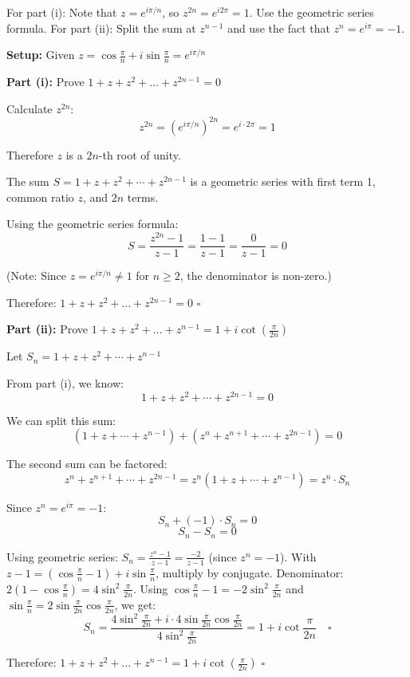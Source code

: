 \begin{hint}
For part (i): Note that $z = e^{i\pi/n}$, so $z^{2n} = e^{i2\pi} = 1$. Use the geometric series formula. For part (ii): Split the sum at $z^{n-1}$ and use the fact that $z^n = e^{i\pi} = -1$.
\end{hint}

\begin{solution}[Proof]
\textbf{Setup:} Given $z = \cos\frac{\pi}{n} + i\sin\frac{\pi}{n} = e^{i\pi/n}$

\textbf{Part (i):} Prove $1 + z + z^2 + \dots + z^{2n-1} = 0$

Calculate $z^{2n}$:
\[
z^{2n} = \left(e^{i\pi/n}\right)^{2n} = e^{i \cdot 2\pi} = 1
\]

Therefore $z$ is a $2n$-th root of unity.

The sum $S = 1 + z + z^2 + \cdots + z^{2n-1}$ is a geometric series with first term 1, common ratio $z$, and $2n$ terms.

Using the geometric series formula:
\[
S = \frac{z^{2n} - 1}{z - 1} = \frac{1 - 1}{z - 1} = \frac{0}{z - 1} = 0
\]

(Note: Since $z = e^{i\pi/n} \neq 1$ for $n \geq 2$, the denominator is non-zero.)

Therefore: $1 + z + z^2 + \dots + z^{2n-1} = 0$ \quad $\square$

\textbf{Part (ii):} Prove $1 + z + z^2 + \dots + z^{n-1} = 1 + i\cot\left(\frac{\pi}{2n}\right)$

Let $S_n = 1 + z + z^2 + \cdots + z^{n-1}$

From part (i), we know:
\[
1 + z + z^2 + \cdots + z^{2n-1} = 0
\]

We can split this sum:
\[
(1 + z + \cdots + z^{n-1}) + (z^n + z^{n+1} + \cdots + z^{2n-1}) = 0
\]

The second sum can be factored:
\[
z^n + z^{n+1} + \cdots + z^{2n-1} = z^n(1 + z + \cdots + z^{n-1}) = z^n \cdot S_n
\]

Since $z^n = e^{i\pi} = -1$:
\[
S_n + (-1) \cdot S_n = 0
\]
\[
S_n - S_n = 0
\]

Using geometric series: $S_n = \frac{z^n-1}{z-1} = \frac{-2}{z-1}$ (since $z^n=-1$). With $z-1 = (\cos\frac{\pi}{n}-1)+i\sin\frac{\pi}{n}$, multiply by conjugate. Denominator: $2(1-\cos\frac{\pi}{n})=4\sin^2\frac{\pi}{2n}$. Using $\cos\frac{\pi}{n}-1=-2\sin^2\frac{\pi}{2n}$ and $\sin\frac{\pi}{n}=2\sin\frac{\pi}{2n}\cos\frac{\pi}{2n}$, we get:
\[
S_n = \frac{4\sin^2\frac{\pi}{2n}+i \cdot 4\sin\frac{\pi}{2n}\cos\frac{\pi}{2n}}{4\sin^2\frac{\pi}{2n}} = 1+i\cot\frac{\pi}{2n} \quad \square
\]

Therefore: $1 + z + z^2 + \dots + z^{n-1} = 1 + i\cot\left(\frac{\pi}{2n}\right)$ \quad $\square$
\end{solution}

